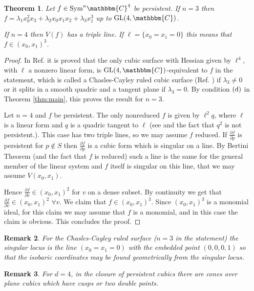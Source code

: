 \documentclass[aps,floatfix,groupedaddress,superscriptaddress,longbibliography,footinbib,notitlepage,showpacs]{revtex4-1}
\newtheorem{theorem}{Theorem}
\newtheorem{remark}[theorem]{Remark}
\begin{document}
\begin{theorem}  
Let $f\in\mathrm{Sym}^n\mathbbm{C}^4$ be persistent. If $n=3$ then $f=\lambda_1x_0^{2}x_3+\lambda_2x_0x_1x_2+\lambda_3x_1^3$ up to $\mathrm{GL}(4,\mathbbm{C})$.

If $n=4$ then $V(f)$ has a triple line. If $\ell=\{x_0=x_1=0\}$ this means that $f\in (x_0, x_1)^{3}$.
\end{theorem}
\begin{proof}
In Ref. \cite[\S 95]{Seg42} it is proved that the only cubic surface with Hessian given by $\ell^4$, with $\ell$ a nonzero linear form, is $\mathrm{GL}(4,\mathbbm{C})$-equivalent to $f$ in the statement, which is called a Chasles-Cayley ruled cubic surface (Ref. \cite[pag. 141]{Seg42}) if $\lambda_3\neq 0$ or it splits in a smooth quadric and a tangent plane if $\lambda_3=0$.
By condition $(\textnormal{d})$ in Theorem \ref{thm:main}, this proves the result for $n=3$. 

Let $n=4$ and $f$ be persistent. The only nonreduced $f$ is given by $\ell^2q$, where $\ell$ is a linear form and $q$ is a quadric tangent to $\ell$ (see \cite[Prop. 2.7]{COCDR} and the fact that $q^2$ is not persistent.). This case has two triple lines, so we may assume $f$ reduced. If $\frac{\partial f}{\partial p}$ is persistent for $p\notin S$ then $\frac{\partial f}{\partial p}$ is a cubic form  which is singular on a line. 
By Bertini Theorem (and the fact that $f$ is reduced) such a line is the same for the general member of the linear system and $f$ itself is singular on this line, that we may assume $V(x_0,x_1)$.

Hence $\frac{\partial f}{\partial v}\in (x_0,x_1)^2$ for $v$ on a dense subset. By continuity we get that $\frac{\partial f}{\partial v}\in (x_0,x_1)^2$ $\forall v$. We claim that $f\in(x_0,x_1)^3$. Since $(x_0,x_1)^3$ is a monomial ideal, for this claim we may assume that $f$ is a monomial, and in this case the claim is obvious. This concludes the proof.
\end{proof}

\begin{remark}
For the Chasles-Cayley ruled surface ($n=3$ in the statement) the singular locus is the line $(x_0=x_1=0)$ with the embedded point $(0,0,0,1)$ so that the isobaric coordinates may be found geometrically from the singular locus.
\end{remark}

\begin{remark}
For $d=4$, in the closure of persistent cubics there are cones over plane cubics which have cusps or two double points.
\end{remark}
\end{document}
